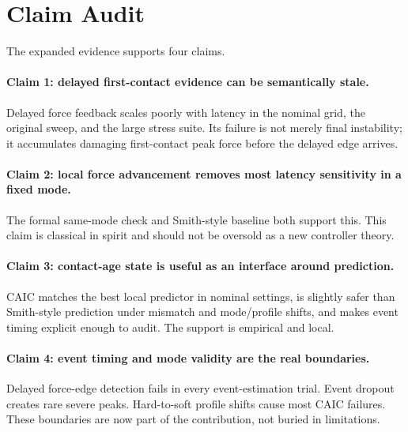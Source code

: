 \documentclass{article}
\newcommand{\caic}{CAIC}
\begin{document}
\begin{table}[p]
    \centering
    \scriptsize
    \caption{Full-scale leaderboard. Unsafe is the rate of peak force above 12 N. Unsafe/miss also counts no-contact runs as failures. Mean and p95 peak are in Newtons. The table is generated from streamed CSV outputs.}
    \label{tab:leaderboard}
    \resizebox{\linewidth}{!}{}
\end{table}

\section{Claim Audit}

The expanded evidence supports four claims.

\paragraph{Claim 1: delayed first-contact evidence can be semantically stale.}
Delayed force feedback scales poorly with latency in the nominal grid, the original sweep, and the large stress suite. Its failure is not merely final instability; it accumulates damaging first-contact peak force before the delayed edge arrives.

\paragraph{Claim 2: local force advancement removes most latency sensitivity in a fixed mode.}
The formal same-mode check and Smith-style baseline both support this. This claim is classical in spirit and should not be oversold as a new controller theory.

\paragraph{Claim 3: contact-age state is useful as an interface around prediction.}
\caic{} matches the best local predictor in nominal settings, is slightly safer than Smith-style prediction under mismatch and mode/profile shifts, and makes event timing explicit enough to audit. The support is empirical and local.

\paragraph{Claim 4: event timing and mode validity are the real boundaries.}
Delayed force-edge detection fails in every event-estimation trial. Event dropout creates rare severe peaks. Hard-to-soft profile shifts cause most \caic{} failures. These boundaries are now part of the contribution, not buried in limitations.
\end{document}
